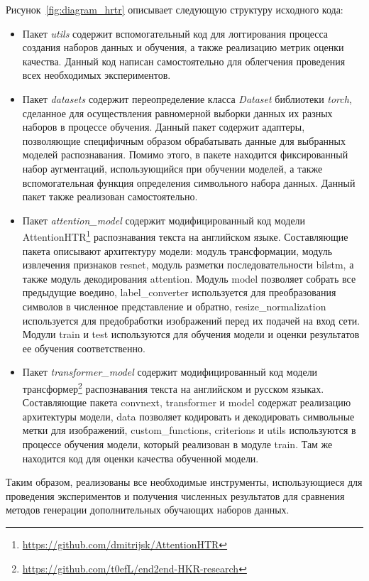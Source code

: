 Рисунок~\ref{fig:diagram_hrtr} описывает следующую структуру исходного кода:
\begin{itemize}
    \item Пакет \textit{utils} содержит вспомогательный код для логгирования процесса создания наборов данных и обучения,
    а также реализацию метрик оценки качества.
    Данный код написан самостоятельно для облегчения проведения всех необходимых экспериментов.
    \item Пакет \textit{datasets} содержит переопределение класса \textit{Dataset} библиотеки \textit{torch},
    сделанное для осуществления равномерной выборки данных их разных наборов в процессе обучения.
    Данный пакет содержит адаптеры, позволяющие специфичным образом обрабатывать данные для выбранных моделей распознавания.
    Помимо этого, в пакете находится фиксированный набор аугментаций, использующийся при обучении моделей,
    а также вспомогательная функция определения символьного набора данных.
    Данный пакет также реализован самостоятельно.
    \item Пакет \textit{attention\_model} содержит модифицированный код модели AttentionHTR\footnote{\url{https://github.com/dmitrijsk/AttentionHTR}}
    распознавания текста на английском языке.
    Составляющие пакета описывают архитектуру модели: модуль трансформации, модуль извлечения признаков resnet,
    модуль разметки последовательности bilstm, а также модуль декодирования attention.
    Модуль model позволяет собрать все предыдущие воедино, label\_converter используется для преобразования символов в численное представление и обратно,
    resize\_normalization используется для предобработки изображений перед их подачей на вход сети.
    Модули train и test используются для обучения модели и оценки результатов ее обучения соответственно.
    \item Пакет \textit{transformer\_model} содержит модифицированный код модели трансформер\footnote{\url{https://github.com/t0efL/end2end-HKR-research}}
    распознавания текста на английском и русском языках.
    Составляющие пакета convnext, transformer и model содержат реализацию архитектуры модели, data позволяет кодировать и декодировать символьные метки для изображений,
    custom\_functions, criterions и utils используются в процессе обучения модели, который реализован в модуле train.
    Там же находится код для оценки качества обученной модели.
\end{itemize}

Таким образом, реализованы все необходимые инструменты, использующиеся для проведения экспериментов и получения численных результатов
для сравнения методов генерации дополнительных обучающих наборов данных.

